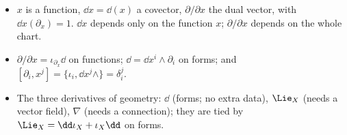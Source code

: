 \begin{keypoints}
\begin{itemize}
\item $x$ is a function, $\dd x=\dd(x)$ a covector, $\partial/\partial x$ the dual vector, with $\dd x(\partial_x)=1$. $\dd x$ depends only on the function $x$; $\partial/\partial x$ depends on the whole chart.
\item $\partial/\partial x=\iota_{\partial_x}\dd$ on functions; $\dd=\dd x^i\wedge\partial_i$ on forms; and $[\partial_i,x^j]=\{\iota_i,\dd x^j\wedge\}=\delta^j_i$.
\item The three derivatives of geometry: $\dd$ (forms; no extra data), $\Lie_X$ (needs a vector field), $\nabla$ (needs a connection); they are tied by $\Lie_X=\dd\iota_X+\iota_X\dd$ on forms.
\end{itemize}
\end{keypoints}
